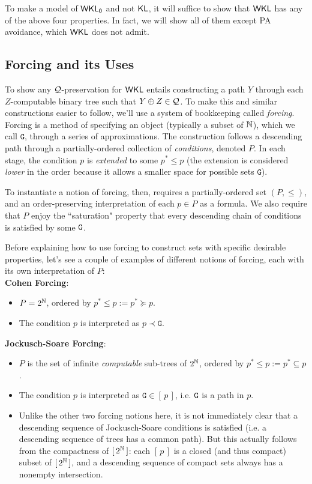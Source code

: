 \documentclass{amsart}
\begin{document}
	To make a model of $\operatorname{\sf{WKL_0}}$ and not $\operatorname{\sf{KL}}$, it will suffice to show that $\sf{WKL}$ has any of the above four properties. In fact, we will show all of them except PA avoidance, which $\sf{WKL}$ does not admit.
	
	
	\subsection{Forcing and its Uses}
	
	To show any $\mathcal{Q}$-preservation for $\sf{WKL}$ entails constructing a path $Y$ through each $Z$-computable binary tree such that $Y\oplus Z \in \mathcal{Q}$. To make this and similar constructions easier to follow, we'll use a system of bookkeeping called \textit{forcing}.\\
	
	Forcing is a method of specifying an object (typically a subset of $\mathbb{N}$), which we call $\mathtt{G}$, through a series of approximations. The construction follows a descending path through a partially-ordered collection of \textit{conditions}, denoted $P$. In each stage, the condition $p$ is \textit{extended} to some $p^*\leq p$ (the extension is considered \textit{lower} in the order because it allows a smaller space for possible sets $\mathtt{G}$). 
	
	To instantiate a notion of forcing, then, requires a partially-ordered set $(P,\leq)$, and an order-preserving interpretation of each $p\in P$ as a formula. We also require that $P$ enjoy the ``saturation" property that every descending chain of conditions is satisfied by some $\tt{G}$. 
	
	Before explaining how to use forcing to construct sets with specific desirable properties, let's see a couple of examples of different notions of forcing, each with its own interpretation of $P$:\\
	
	\textbf{Cohen Forcing}: 
	\begin{itemize}
		\item $P = 2^{\mathbb{N}}$, ordered by $p^*\leq p := p^*\succeq p$.
		\item The condition $p$ is interpreted as $p\prec \mathtt{G}$.
	\end{itemize}
	
	\textbf{Jockusch-Soare Forcing}: 
	\begin{itemize} 
		\item $P$ is the set of infinite \textit{computable} sub-trees of $2^{\mathbb{N}}$, ordered by $p^*\leq p := p^*\subseteq p$.
		\item The condition $p$ is interpreted as $\mathtt{G}\in [\, p \,]$, i.e. $\tt{G}$ is a path in $p$.
		\item Unlike the other two forcing notions here, it is not immediately clear that a descending sequence of Jockusch-Soare conditions is satisfied (i.e. a descending sequence of trees has a common path). But this actually follows from the compactness of $[\, 2^{\mathbb{N}}\,]$: each $[\,p\,]$ is a closed (and thus compact) subset of $[\,2^{\mathbb{N}}\,]$, and a descending sequence of compact sets always has a nonempty intersection. 
	\end{itemize}
	
\end{document}
